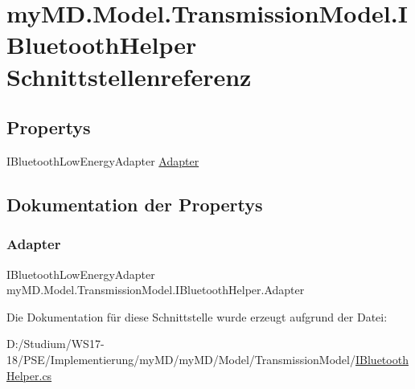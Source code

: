 \hypertarget{interfacemy_m_d_1_1_model_1_1_transmission_model_1_1_i_bluetooth_helper}{}\section{my\+M\+D.\+Model.\+Transmission\+Model.\+I\+Bluetooth\+Helper Schnittstellenreferenz}
\label{interfacemy_m_d_1_1_model_1_1_transmission_model_1_1_i_bluetooth_helper}
\subsection*{Propertys}
\begin{DoxyCompactItemize}
\item 
I\+Bluetooth\+Low\+Energy\+Adapter \mbox{\hyperlink{interfacemy_m_d_1_1_model_1_1_transmission_model_1_1_i_bluetooth_helper_afcdf2bd392d481cff915fdfc1e873d54}{Adapter}}
\end{DoxyCompactItemize}


\subsection{Dokumentation der Propertys}
\mbox{\label{interfacemy_m_d_1_1_model_1_1_transmission_model_1_1_i_bluetooth_helper_afcdf2bd392d481cff915fdfc1e873d54}} 
\subsubsection{\texorpdfstring{Adapter}{Adapter}}
{\footnotesize\ttfamily I\+Bluetooth\+Low\+Energy\+Adapter my\+M\+D.\+Model.\+Transmission\+Model.\+I\+Bluetooth\+Helper.\+Adapter\hspace{0.3cm}{\ttfamily [get]}}



Die Dokumentation für diese Schnittstelle wurde erzeugt aufgrund der Datei\+:\begin{DoxyCompactItemize}
\item 
D\+:/\+Studium/\+W\+S17-\/18/\+P\+S\+E/\+Implementierung/my\+M\+D/my\+M\+D/\+Model/\+Transmission\+Model/\mbox{\hyperlink{_i_bluetooth_helper_8cs}{I\+Bluetooth\+Helper.\+cs}}\end{DoxyCompactItemize}
